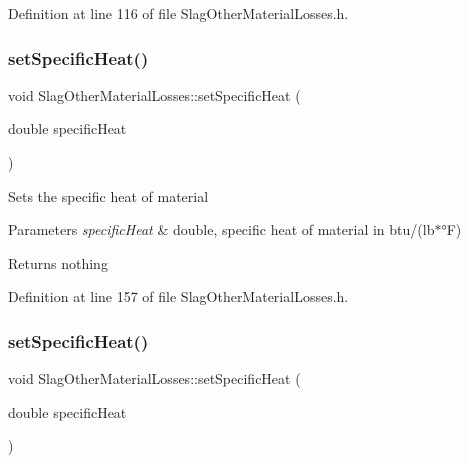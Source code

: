 Definition at line 116 of file Slag\+Other\+Material\+Losses.\+h.

\mbox{\label{class_slag_other_material_losses_a05488997f264a74afe3229250a286f92}} 
\subsubsection{\texorpdfstring{set\+Specific\+Heat()}{setSpecificHeat()}\hspace{0.1cm}{\footnotesize\ttfamily [1/3]}}
{\footnotesize\ttfamily void Slag\+Other\+Material\+Losses\+::set\+Specific\+Heat (\begin{DoxyParamCaption}\item[{double}]{specific\+Heat }\end{DoxyParamCaption})\hspace{0.3cm}{\ttfamily [inline]}}

Sets the specific heat of material


\begin{DoxyParams}{Parameters}
{\em specific\+Heat} & double, specific heat of material in btu/(lb$\ast$°F)\\
\hline
\end{DoxyParams}
\begin{DoxyReturn}{Returns}
nothing 
\end{DoxyReturn}


Definition at line 157 of file Slag\+Other\+Material\+Losses.\+h.

\mbox{\label{class_slag_other_material_losses_a05488997f264a74afe3229250a286f92}} 
\subsubsection{\texorpdfstring{set\+Specific\+Heat()}{setSpecificHeat()}\hspace{0.1cm}{\footnotesize\ttfamily [2/3]}}
{\footnotesize\ttfamily void Slag\+Other\+Material\+Losses\+::set\+Specific\+Heat (\begin{DoxyParamCaption}\item[{double}]{specific\+Heat }\end{DoxyParamCaption})\hspace{0.3cm}{\ttfamily [inline]}}

